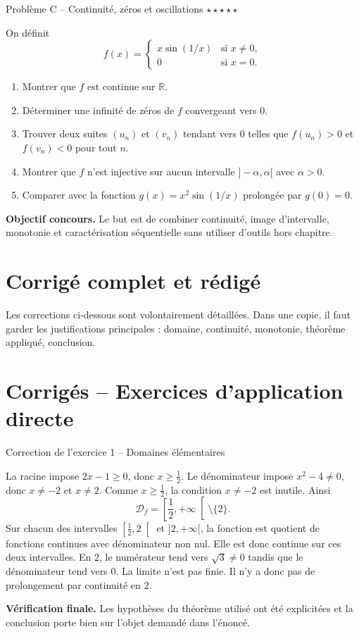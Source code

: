 \documentclass[11pt,a4paper]{article}
\newcommand{\etoiles}[1]{\hfill\textcolor{orangeprepa}{\textbf{#1}}}
\newcommand{\R}{\mathbb{R}}
\newcommand{\dom}{\mathcal D}
\begin{document}
\begin{problembox}{Problème C -- Continuité, zéros et oscillations \etoiles{$\star\star\star\star\star$}}

On définit
\[
f(x)=\begin{cases}
x\sin(1/x)&\text{si }x\neq0,\\
0&\text{si }x=0.
\end{cases}
\]
\begin{enumerate}
\item Montrer que $f$ est continue sur $\R$.
\item Déterminer une infinité de zéros de $f$ convergeant vers $0$.
\item Trouver deux suites $(u_n)$ et $(v_n)$ tendant vers $0$ telles que $f(u_n)>0$ et $f(v_n)<0$ pour tout $n$.
\item Montrer que $f$ n'est injective sur aucun intervalle $]-\alpha,\alpha[$ avec $\alpha>0$.
\item Comparer avec la fonction $g(x)=x^2\sin(1/x)$ prolongée par $g(0)=0$.
\end{enumerate}

\medskip
\textbf{Objectif concours.} Le but est de combiner continuité, image d'intervalle, monotonie et caractérisation séquentielle sans utiliser d'outils hors chapitre.
\end{problembox}
\newpage
\section{Corrigé complet et rédigé}
\begin{attentionbox}
Les corrections ci-dessous sont volontairement détaillées. Dans une copie, il faut garder les justifications principales : domaine, continuité, monotonie, théorème appliqué, conclusion.
\end{attentionbox}
\section{Corrigés -- Exercices d'application directe}
\begin{corrbox}{Correction de l'exercice 1 -- Domaines élémentaires}

La racine impose $2x-1\geq 0$, donc $x\geq \frac12$. Le dénominateur impose $x^2-4\neq0$, donc $x\neq -2$ et $x\neq2$. Comme $x\geq\frac12$, la condition $x\neq-2$ est inutile. Ainsi
\[
\dom_f=\left[\frac12,+\infty\right[\setminus\{2\}.
\]
Sur chacun des intervalles $\left[\frac12,2\right[$ et $]2,+\infty[$, la fonction est quotient de fonctions continues avec dénominateur non nul. Elle est donc continue sur ces deux intervalles.
En $2$, le numérateur tend vers $\sqrt3\neq0$ tandis que le dénominateur tend vers $0$. La limite n'est pas finie. Il n'y a donc pas de prolongement par continuité en $2$.

\medskip
\textbf{Vérification finale.} Les hypothèses du théorème utilisé ont été explicitées et la conclusion porte bien sur l'objet demandé dans l'énoncé.
\end{corrbox}
\end{document}

